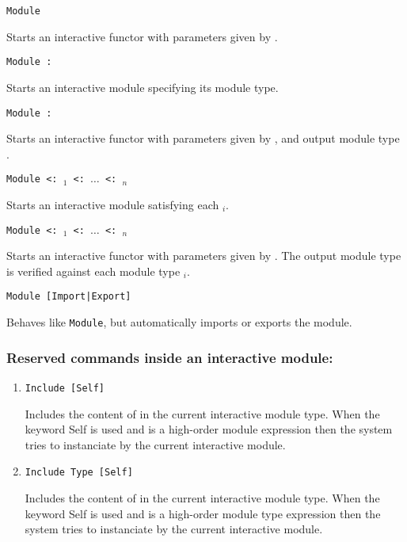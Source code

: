 \begin{Variants}

\item{\tt Module {\ident} {\modbindings}}

  Starts an interactive functor with parameters given by {\modbindings}.

\item{\tt Module {\ident} \verb.:. {\modtype}}

  Starts an interactive module specifying its module type. 

\item{\tt Module {\ident} {\modbindings} \verb.:. {\modtype}}

  Starts an interactive functor with parameters given by
  {\modbindings}, and output module type {\modtype}.

\item{\tt Module {\ident} \verb.<:. {\modtype$_1$} \verb.<:. $\ldots$ \verb.<:.{ \modtype$_n$}}

  Starts an interactive module satisfying each {\modtype$_i$}. 

\item{\tt Module {\ident} {\modbindings} \verb.<:. {\modtype$_1$} \verb.<:. $\ldots$ \verb.<:. {\modtype$_n$}}

  Starts an interactive functor with parameters given by
  {\modbindings}. The output module type is verified against each
  module type {\modtype$_i$}.

\item\texttt{Module [Import|Export]}

  Behaves like \texttt{Module}, but automatically imports or exports
  the module.

\end{Variants}
\subsubsection{Reserved commands inside an interactive module:
}
\begin{enumerate}
\item {\tt Include [Self] {\modexpr}}

 Includes the content of {\modexpr} in the current interactive module type. When the keyword Self 
 is used and {\modexpr} is a high-order module expression then the system tries to instanciate {\modexpr}
 by the current interactive module.

\item {\tt Include Type [Self] {\modtype}}

 Includes the content of {\modtype} in the current interactive module type. When the keyword Self 
 is used and {\modtype} is a high-order module type expression then the system tries to instanciate {\modtype}
 by the current interactive module.

\end{enumerate}
